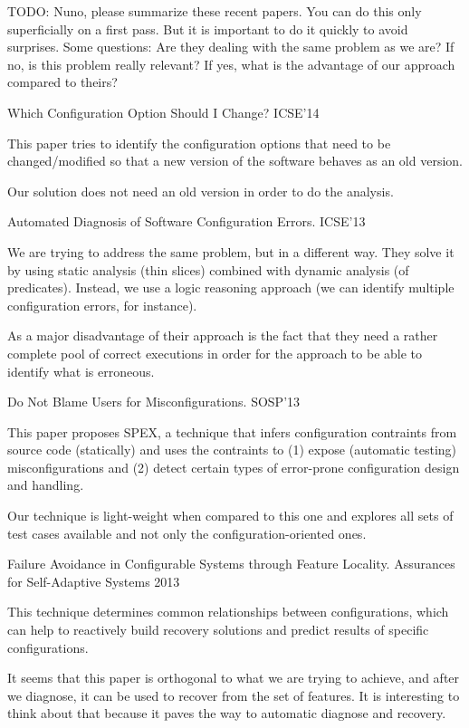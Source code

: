 TODO: Nuno, please summarize these recent papers.  You can do this
only superficially on a first pass.  But it is important to do it
quickly to avoid surprises.  Some questions: Are they dealing with the
same problem as we are?  If no, is this problem really relevant?  If
yes, what is the advantage of our approach compared to theirs?

Which Configuration Option Should I Change?  ICSE'14

This paper tries to identify the configuration options that need to be changed/modified
so that a new version of the software behaves as an old version.

Our solution does not need an old version in order to do the analysis.

Automated Diagnosis of Software Configuration Errors.  ICSE'13

We are trying to address the same problem, but in a different way. They solve it by using
static analysis (thin slices) combined with dynamic analysis (of predicates). Instead, we
use a logic reasoning approach (we can identify multiple configuration errors, for instance).

As a major disadvantage of their approach is the fact that they need a rather complete pool
of correct executions in order for the approach to be able to identify what is erroneous.


Do Not Blame Users for Misconfigurations.  SOSP'13

This paper proposes SPEX, a technique that infers configuration contraints from source
code (statically) and uses the contraints to (1) expose (automatic testing) misconfigurations
and (2) detect certain types of error-prone configuration design and handling.

Our technique is light-weight when compared to this one and explores all sets of test
cases available and not only the configuration-oriented ones.


Failure Avoidance in Configurable Systems through Feature Locality. Assurances for Self-Adaptive Systems 2013

This technique determines common relationships between configurations, which can help to reactively
build recovery solutions and predict results of specific configurations.

It seems that this paper is orthogonal to what we are trying to achieve, and after we diagnose, it
can be used to recover from the set of features. It is interesting to think about that because it
paves the way to automatic diagnose and recovery.
